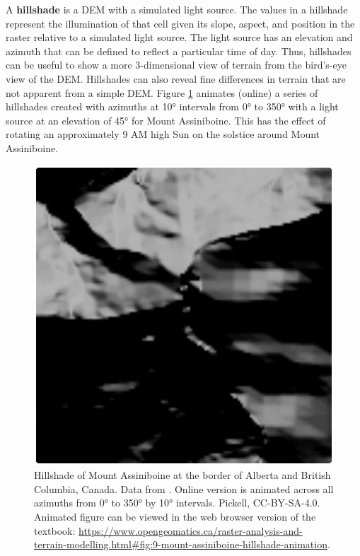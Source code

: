 \documentclass[
]{book}
\begin{document}
A \textbf{hillshade} is a DEM with a simulated light source. The values in a hillshade represent the illumination of that cell given its slope, aspect, and position in the raster relative to a simulated light source. The light source has an elevation and azimuth that can be defined to reflect a particular time of day. Thus, hillshades can be useful to show a more 3-dimensional view of terrain from the bird's-eye view of the DEM. Hillshades can also reveal fine differences in terrain that are not apparent from a simple DEM. Figure \ref{fig:9-mount-assiniboine-hillshade-animation} animates (online) a series of hillshades created with azimuths at 10° intervals from 0° to 350° with a light source at an elevation of 45° for Mount Assiniboine. This has the effect of rotating an approximately 9 AM high Sun on the solstice around Mount Assiniboine.



\begin{figure}
\includegraphics[width=0.75\linewidth]{images/09-mount-assiniboine-hillshade-animation-static} \caption{Hillshade of Mount Assiniboine at the border of Alberta and British Columbia, Canada. Data from \citet{natural_resources_canada_canadian_2015}. Online version is animated across all azimuths from 0° to 350° by 10° intervals. Pickell, CC-BY-SA-4.0. Animated figure can be viewed in the web browser version of the textbook: \url{https://www.opengeomatics.ca/raster-analysis-and-terrain-modelling.html\#fig:9-mount-assiniboine-hillshade-animation}.}\label{fig:9-mount-assiniboine-hillshade-animation}
\end{figure}
\end{document}

